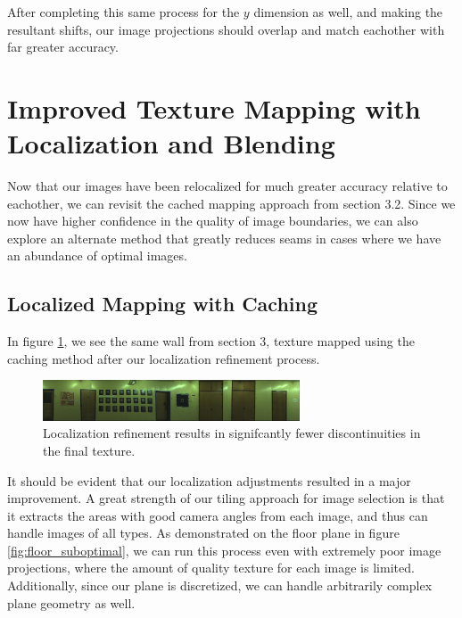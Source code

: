 \documentclass[10pt,twocolumn,letterpaper]{article}
\begin{document}
After completing this same process for the $y$ dimension as well, and
making the resultant shifts, our image projections should overlap and
match eachother with far greater accuracy.


\section{Improved Texture Mapping with Localization and Blending}
Now that our images have been relocalized for much greater accuracy
relative to eachother, we can revisit the cached mapping approach from
section 3.2. Since we now have higher confidence in the quality of
image boundaries, we can also explore an alternate method that greatly
reduces seams in cases where we have an abundance of optimal images.

\subsection{Localized Mapping with Caching}
In figure \ref{fig:shifted}, we see the same wall from section 3,
texture mapped using the caching method after our localization
refinement process.

\begin{figure}
  \centering
  \includegraphics[width=3in]{wall1_cache_full_shifted.jpg}
  \caption{Localization refinement results in signifcantly fewer
    discontinuities in the final texture.}
  \label{fig:shifted}
\end{figure}


It should be evident that our localization adjustments resulted in a
major improvement. A great strength of our tiling approach for image
selection is that it extracts the areas with good camera angles from
each image, and thus can handle images of all types. As demonstrated
on the floor plane in figure \ref{fig:floor_suboptimal}, we can run
this process even with extremely poor image projections, where the
amount of quality texture for each image is limited. Additionally,
since our plane is discretized, we can handle arbitrarily
complex plane geometry as well.
\end{document}
